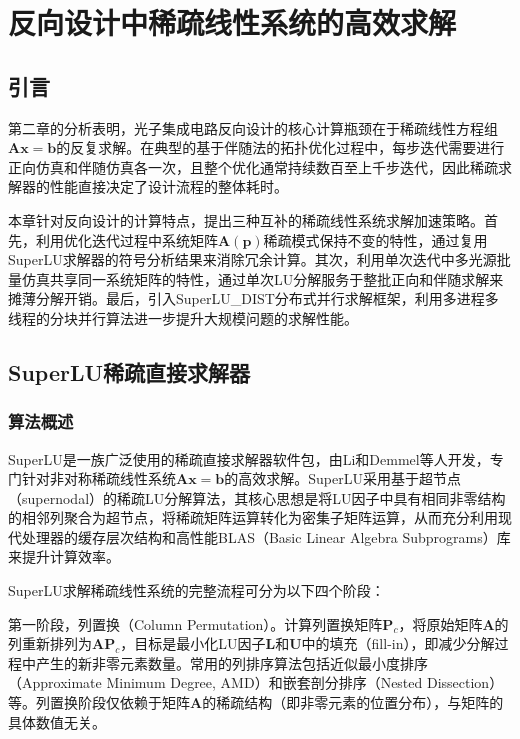 \chapter{反向设计中稀疏线性系统的高效求解}

\section{引言}

第二章的分析表明，光子集成电路反向设计的核心计算瓶颈在于稀疏线性方程组$\boldsymbol{A}\boldsymbol{x} = \boldsymbol{b}$的反复求解。在典型的基于伴随法的拓扑优化过程中，每步迭代需要进行正向仿真和伴随仿真各一次，且整个优化通常持续数百至上千步迭代，因此稀疏求解器的性能直接决定了设计流程的整体耗时。

本章针对反向设计的计算特点，提出三种互补的稀疏线性系统求解加速策略。首先，利用优化迭代过程中系统矩阵$\boldsymbol{A}(\boldsymbol{p})$稀疏模式保持不变的特性，通过复用SuperLU求解器的符号分析结果来消除冗余计算。其次，利用单次迭代中多光源批量仿真共享同一系统矩阵的特性，通过单次LU分解服务于整批正向和伴随求解来摊薄分解开销。最后，引入SuperLU\_DIST分布式并行求解框架，利用多进程多线程的分块并行算法进一步提升大规模问题的求解性能。

\section{SuperLU稀疏直接求解器}

\subsection{算法概述}

SuperLU是一族广泛使用的稀疏直接求解器软件包，由Li和Demmel等人开发\cite{Li2005}，专门针对非对称稀疏线性系统$\boldsymbol{A}\boldsymbol{x} = \boldsymbol{b}$的高效求解。SuperLU采用基于超节点（supernodal）的稀疏LU分解算法\cite{Demmel1999}，其核心思想是将LU因子中具有相同非零结构的相邻列聚合为超节点，将稀疏矩阵运算转化为密集子矩阵运算，从而充分利用现代处理器的缓存层次结构和高性能BLAS（Basic Linear Algebra Subprograms）库来提升计算效率。

SuperLU求解稀疏线性系统的完整流程可分为以下四个阶段\cite{Li2005}：

第一阶段，列置换（Column Permutation）。计算列置换矩阵$\boldsymbol{P}_c$，将原始矩阵$\boldsymbol{A}$的列重新排列为$\boldsymbol{A}\boldsymbol{P}_c$，目标是最小化LU因子$\boldsymbol{L}$和$\boldsymbol{U}$中的填充（fill-in），即减少分解过程中产生的新非零元素数量。常用的列排序算法包括近似最小度排序（Approximate Minimum Degree, AMD）和嵌套剖分排序（Nested Dissection）等。列置换阶段仅依赖于矩阵$\boldsymbol{A}$的稀疏结构（即非零元素的位置分布），与矩阵的具体数值无关。


